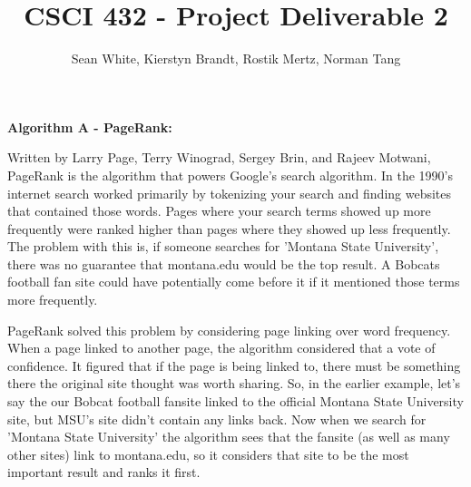 \documentclass[12pt]{article}
\author{Sean White, Kierstyn Brandt, Rostik Mertz, Norman Tang}
\title{CSCI 432 - Project Deliverable 2}
\begin{document}
\maketitle

\noindent
\textbf{Algorithm A - PageRank:}\smallskip

Written by Larry Page, Terry Winograd, Sergey Brin, and Rajeev Motwani, PageRank is the algorithm that powers Google's search algorithm. In the 1990's internet search worked primarily by tokenizing your search and finding websites that contained those words. Pages where your search terms showed up more frequently were ranked higher than pages where they showed up less frequently. The problem with this is, if someone searches for 'Montana State University', there was no guarantee that montana.edu would be the top result. A Bobcats football fan site could have potentially come before it if it mentioned those terms more frequently.

PageRank solved this problem by considering page linking over word frequency. When a page linked to another page, the algorithm considered that a vote of confidence. It figured that if the page is being linked to, there must be something there the original site thought was worth sharing. So, in the earlier example, let's say the our Bobcat football fansite linked to the official Montana State University site, but MSU's site didn't contain any links back. Now when we search for 'Montana State University' the algorithm sees that the fansite (as well as many other sites) link to montana.edu, so it considers that site to be the most important result and ranks it first.
\bigskip
\end{document}
